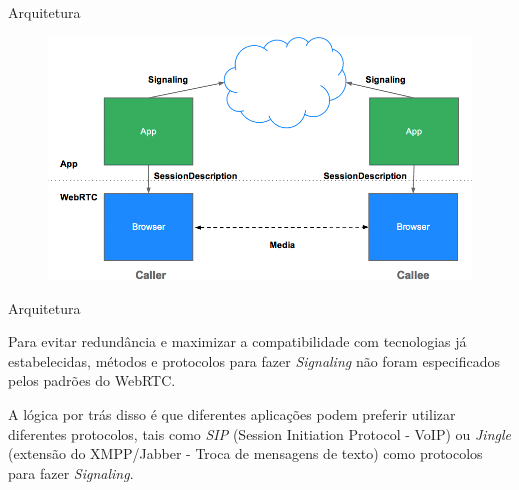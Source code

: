 \begin{frame}{Arquitetura}

\begin{figure}[h]
    \includegraphics[scale=0.35]{img/jsep.png}
\end{figure}

\end{frame}

\begin{frame}{Arquitetura}

Para evitar redundância e maximizar a compatibilidade com tecnologias já
estabelecidas, métodos e protocolos para fazer \emph{Signaling} não
foram especificados pelos padrões do WebRTC.

A lógica por trás disso é que diferentes aplicações podem preferir
utilizar diferentes protocolos, tais como \emph{SIP} (Session Initiation
Protocol - VoIP) ou \emph{Jingle} (extensão do XMPP/Jabber - Troca de
mensagens de texto) como protocolos para fazer \emph{Signaling}.

\end{frame}
